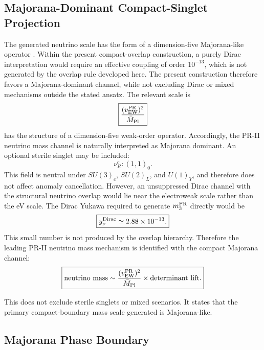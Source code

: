 \documentclass[11pt]{article}
\begin{document}
\subsection{Majorana-Dominant Compact-Singlet Projection}
\label{sec:pr2_majorana_dominant_compact_singlet_projection}
The generated neutrino scale has the form of a dimension-five Majorana-like operator \cite{Weinberg1979}. Within the present compact-overlap construction, a purely Dirac interpretation would require an effective coupling of order \(10^{-13}\), which is not generated by the overlap rule developed here. The present construction therefore favors a Majorana-dominant channel, while not excluding Dirac or mixed mechanisms outside the stated ansatz. The relevant scale is
\begin{equation}
\boxed{
\frac{
(v_{\rm EW}^{\rm PR})^2
}{
\bar M_{\rm Pl}
}
}
\end{equation}
has the structure of a dimension-five weak-order operator. 
Accordingly, the PR-II neutrino mass channel is naturally interpreted as Majorana dominant. An optional sterile singlet may be included:
\begin{equation}
\boxed{
\nu_R^c:(1,1)_0.
}
\end{equation}
This field is neutral under \(SU(3)_c\), \(SU(2)_L\), and \(U(1)_Y\), and therefore does not affect anomaly cancellation. 
However, an unsuppressed Dirac channel with the structural neutrino overlap would lie near the electroweak scale rather than the eV scale. 
The Dirac Yukawa required to generate \(m_3^{\rm PR}\) directly would be
\begin{equation}
\boxed{
y_\nu^{\rm Dirac}
\simeq
2.88\times10^{-13}.
}
\end{equation}
This small number is not produced by the overlap hierarchy. 
Therefore the leading PR-II neutrino mass mechanism is identified with the compact Majorana channel:
\begin{equation}
\boxed{
\text{neutrino mass}
\sim
\frac{
(v_{\rm EW}^{\rm PR})^2
}{
\bar M_{\rm Pl}
}
\times
\text{determinant lift}.
}
\end{equation}

This does not exclude sterile singlets or mixed scenarios. 
It states that the primary compact-boundary mass scale generated is Majorana-like.

\subsection{Majorana Phase Boundary}
\label{sec:pr2_majorana_phase_boundary}
\end{document}

